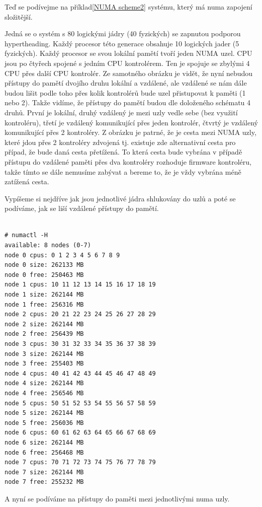 \documentclass[a4paper,12pt]{article}
\begin{document}
Teď se podívejme na příklad\ref{NUMA scheme2} systému, který má numa zapojení složitější.

Jedná se o systém s 80 logickými jádry (40 fyzických) se zapnutou podporou hypertheading. Každý procesor této generace obsahuje 10 logických jader (5 fyzických). Každý procesor se svou lokální pamětí tvoří jeden NUMA uzel. CPU jsou po čtyřech spojené s jedním CPU kontrolérem. Ten je spojuje se zbylými 4 CPU přes další CPU kontrolér. Ze samotného obrázku je vidět, že nyní nebudou přístupy do pamětí dvojího druhu lokální a vzdálené, ale vzdálené se nám dále budou lišit podle toho přes kolik kontrolérů bude uzel přistupovat k paměti (1 nebo 2). Takže vidíme, že přístupy do pamětí budou dle doloženého schématu 4 druhů. První je lokální, druhý vzdálený je mezi uzly vedle sebe (bez využití kontroléru), třetí je vzdálený komunikující přes jeden kontrolér, čtvrtý je vzdálený komunikující přes 2 kontroléry. Z obrázku je patrné, že je cesta mezi NUMA uzly, které jdou přes 2 kontroléry zdvojená tj. existuje zde alternativní cesta pro případ, že bude daná cesta přetížená. To která cesta bude vybrána v případě přístupu do vzdálené paměti přes dva kontroléry rozhoduje firmware kontroléru, takže tímto se dále nemusíme zabývat a bereme to, že je vždy vybrána méně zatížená cesta.

Vypíšeme si nejdříve jak jsou jednotlivé jádra shlukovány do uzlů a poté se podíváme, jak se liší vzdálené přístupy do pamětí.

\begin{verbatim}

# numactl -H
available: 8 nodes (0-7)
node 0 cpus: 0 1 2 3 4 5 6 7 8 9
node 0 size: 262133 MB
node 0 free: 250463 MB
node 1 cpus: 10 11 12 13 14 15 16 17 18 19
node 1 size: 262144 MB
node 1 free: 256316 MB
node 2 cpus: 20 21 22 23 24 25 26 27 28 29
node 2 size: 262144 MB
node 2 free: 256439 MB
node 3 cpus: 30 31 32 33 34 35 36 37 38 39
node 3 size: 262144 MB
node 3 free: 255403 MB
node 4 cpus: 40 41 42 43 44 45 46 47 48 49
node 4 size: 262144 MB
node 4 free: 256546 MB
node 5 cpus: 50 51 52 53 54 55 56 57 58 59
node 5 size: 262144 MB
node 5 free: 256036 MB
node 6 cpus: 60 61 62 63 64 65 66 67 68 69
node 6 size: 262144 MB
node 6 free: 256468 MB
node 7 cpus: 70 71 72 73 74 75 76 77 78 79
node 7 size: 262144 MB
node 7 free: 255232 MB

\end{verbatim}

A nyní se podíváme na přístupy do paměti mezi jednotlivými numa uzly. 
\end{document}
